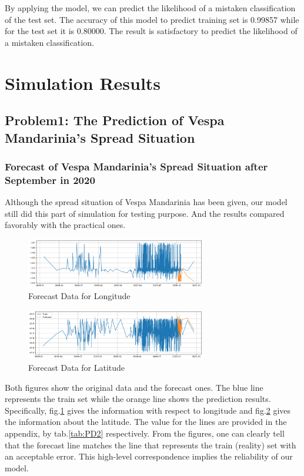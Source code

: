 \documentclass{mcmthesis}
\begin{document}
 By applying the model, we can predict the likelihood of a mistaken classification of the test set. The accuracy of this model to predict training set is 0.99857 while for the test set it is 0.80000. The result is satisfactory to predict the likelihood of a mistaken classification.



\section{Simulation Results}
\subsection{Problem1: The Prediction of Vespa Mandarinia's Spread Situation}
\subsubsection{Forecast of Vespa Mandarinia's Spread Situation after September in 2020 }
Although the spread situation of Vespa Mandarinia has been given, our model still did this part of simulation for testing purpose. And the results compared favorably with the practical ones.
\begin{figure}[!htbp]
	\centering
 	\includegraphics[width = 0.7\textwidth]{Longitude.png} 
	\caption{Forecast Data for Longitude}
	\label{fig:long}
\end{figure}

\begin{figure}[!htbp]
	\centering
 	\includegraphics[width = 0.7\textwidth]{Latitude.png} 
	\caption{Forecast Data for Latitude}
	\label{fig:lat}
\end{figure}
Both figures show the original data and the forecast ones. The blue line represents the train set while the orange line shows the prediction results. Specifically, fig.\ref{fig:long} gives the information with respect to longitude and fig.\ref{fig:lat} gives the information about the latitude. The value for the lines are provided in the appendix, by tab.\ref{tab:PD2} respectively. From the figures, one can clearly tell that the forecast line matches the line that represents the train (reality) set with an acceptable error. This high-level correspondence implies the reliability of our model.
\end{document}
